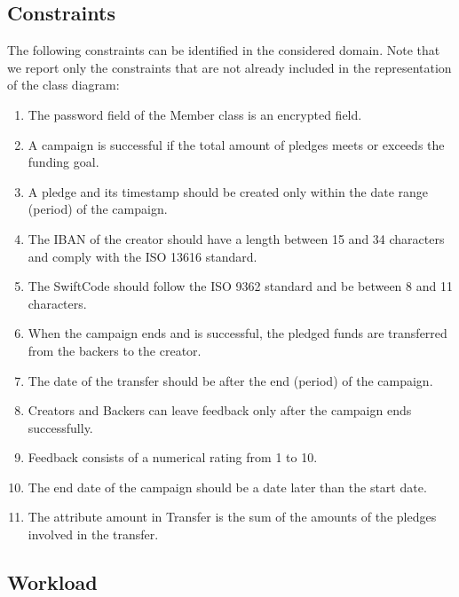 \documentclass[pdflatex,sn-mathphys-num]{sn-jnl}
\begin{document}
\subsection{Constraints}
The following constraints can be identified in the considered domain. Note that we report only the
constraints that are not already included in the representation of the class diagram:
\begin{enumerate}
\item The password field of the Member class is an encrypted field.
\item A campaign is successful if the total amount of pledges meets or exceeds the funding goal.
\item A pledge and its timestamp should be created only within the date range (period) of the campaign.
\item The IBAN of the creator should have a length between 15 and 34 characters and comply with the ISO 13616 standard.
\item The SwiftCode should follow the ISO 9362 standard and be between 8 and 11 characters.
\item When the campaign ends and is successful, the pledged funds are transferred from the backers to the creator.
\item The date of the transfer should be after the end (period) of the campaign.
\item Creators and Backers can leave feedback only after the campaign ends successfully.
\item Feedback consists of a numerical rating from 1 to 10.
\item The end date of the campaign should be a date later than the start date.
\item The attribute amount in Transfer is the sum of the amounts of the pledges involved in the transfer.
\end{enumerate}
\subsection{Workload}
\end{document}
